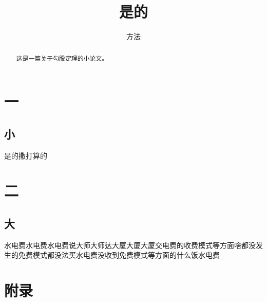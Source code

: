 \documentclass[12pt]{article} %
\begin{document}
  
\title{是的}
\author{方法}
\maketitle
\begin{abstract}         
这是一篇关于勾股定理的小论文。
\end{abstract}
\tableofcontents 
\section{一}  
\subsection{小}
是的撒打算的
\section{二}
\subsection{大}
水电费水电费水电费说大师大师达大厦大厦大厦交电费的收费模式等方面啥都没发生的免费模式都没法买水电费没收到免费模式等方面的什么饭水电费

\section{附录}  
\end{document}
